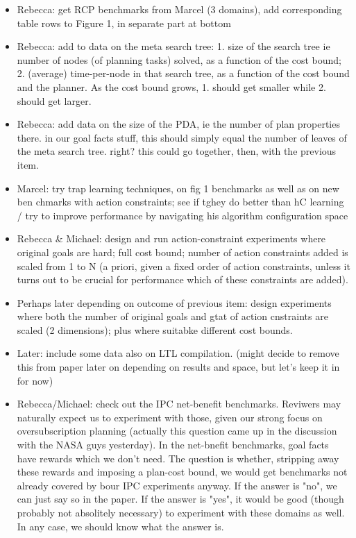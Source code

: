 \documentclass{article}
\begin{document}

\begin{itemize}
\item Rebecca: get RCP benchmarks from Marcel (3 domains), add corresponding table rows to Figure 1, in separate part at bottom
\item Rebecca: add to data on the meta search tree: 1. size of the search tree ie number of nodes (of planning tasks) solved, as a function of the cost bound; 2. (average) time-per-node in that search tree, as a function of the cost bound and the planner.  As the cost bound grows, 1. should get smaller while 2. should get larger.
\item Rebecca: add data on the size of the PDA, ie the number of plan
   properties there. in our goal facts stuff, this should simply equal
   the number of leaves of the meta search tree. right? this could go
   together, then, with the previous item.
\item Marcel: try trap learning techniques, on fig 1 benchmarks as well as on new ben chmarks with action constraints; see if tghey do better than hC learning / try to improve performance by navigating his algorithm configuration space
\item Rebecca \& Michael: design and run action-constraint experiments where original goals are hard; full cost bound; number of action constraints added is scaled from 1 to N (a priori, given a fixed order of action constraints, unless it turns out to be crucial for performance which of these constraints are added).
\item Perhaps later depending on outcome of previous item: design experiments where both the number of original goals and gtat of action cnstraints are scaled (2 dimensions); plus where suitabke different cost bounds.
\item Later: include some data also on LTL compilation. (might decide to remove this from paper later on depending on results and space, but let's keep it in for now)
\item Rebecca/Michael: check out the IPC net-benefit benchmarks. Reviwers may naturally expect us to experiment with those, given our strong focus on oversubscription planning (actually this question came up in the discussion with the NASA guys yesterday). In the net-bnefit benchmarks, goal facts have rewards which we don't need. The question is whether, stripping away these rewards and imposing a plan-cost bound, we would get benchmarks not already covered by bour IPC experiments anyway. If the answer is "no", we can just say so in the paper. If the answer is "yes", it would be good (though probably not absolitely necessary) to experiment with these domains as well. In any case, we should know what the answer is.
\end{itemize}
\end{document}
